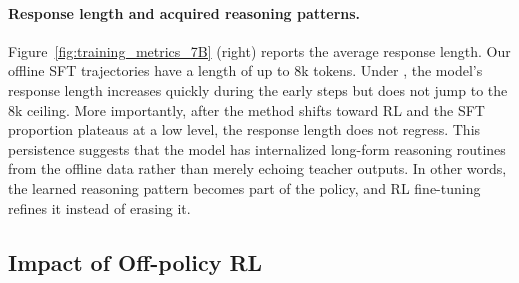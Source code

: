 \paragraph{Response length and acquired reasoning patterns.}
Figure~\ref{fig:training_metrics_7B} (right) reports the average response length. Our offline SFT trajectories have a length of up to 8k tokens. Under \mot, the model’s response length increases quickly during the early steps but does not jump to the 8k ceiling.
More importantly, after the method shifts toward RL and the SFT proportion plateaus at a low level, the response length does not regress. This persistence suggests that the model has internalized long-form reasoning routines from the offline data rather than merely echoing teacher outputs. In other words, the learned reasoning pattern becomes part of the policy, and RL fine-tuning refines it instead of erasing it.



 


\subsection{Impact of Off-policy RL}
\label{sec:impact_of_off-policy_rl}


\begin{table}[!h]
\centering
\caption{Performance of different training paradigms to evaluate the impact of Off-policy RL.
\textbf{SFT/ON} denotes SFT/On-policy~(\mot), 
\textbf{OFF/ON} denotes Off-policy/On-policy,
and \textbf{Mix/ON} denotes Mix-policy/On-policy.}
\label{tab:offpolicy_rl_impact}
\end{table}

